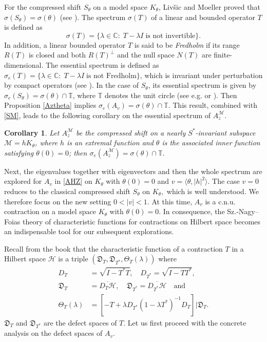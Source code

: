 \documentclass[12pt,reqno]{amsart}
\newtheorem{cor}[thm]{Corollary}
\theoremstyle{definition}
\theoremstyle{remark}
\numberwithin{equation}{section}
\newcommand{\la}{\langle}
\newcommand{\ra}{\rangle}
\newcommand{\ma}{\mathcal}
\begin{document}
For the compressed shift $S_\theta$ on a model space $K_\theta$, Liv\v{s}ic and Moeller  proved that $\sigma(S_\theta)=\sigma(\theta)$ (see \cite{Li,Mo}). The spectrum $\sigma(T)$ of a linear and bounded operator $T$ is defined as $$\sigma(T)=\{\lambda \in \mathbb{C}:\;T- \lambda I\;\mbox{is not invertible}\}.$$ In addition, a linear bounded operator $T$ is said to be \emph{Fredholm} if its range $R(T)$ is closed and both $R(T)^{\perp}$ and the null space $N(T)$ are finite-dimensional. The essential spectrum is defined as $\sigma_e(T)=\{\lambda\in \mathbb{C}:\; T-\lambda I\;\mbox{is not Fredholm}\}$, which is invariant under perturbation by compact operators (see \cite{SM}). In the case of  $S_\theta$, its essential spectrum is given by $\sigma_e(S_\theta)=\sigma(\theta)\cap \mathbb{T}$, where $\mathbb{T}$ denotes the unit circle (see e.g. \cite[Proposition 9.26]{GMR} or \cite[Lemma 2.5]{Sarason1}). Then Proposition \ref{Aztheta} implies $\sigma_e(A_v)=\sigma(\theta)\cap\mathbb{T}.$ This result, combined with  \eqref{SM}, leads to the following corollary on the essential spectrum of $A_z^\ma{M}$.

\begin{cor}\label{cor ess} Let $A_z^{\ma{M}}$ be the compressed shift on a nearly $S^*$-invariant subspace $\ma{M}=hK_\theta$, where $h$ is an extremal function and $\theta$ is the associated inner function satisfying $\theta(0)=0$;  then $\sigma_e(A_z^\ma{M})=\sigma(\theta)\cap\mathbb{T}.$\end{cor}


Next, the eigenvalues together with eigenvectors and then the whole spectrum are explored for $A_v$ in \eqref{AHZ}
on $K_\theta$ with $\theta(0)=0$ and $v=\la \theta, |h|^2\ra$. The case $v=0$ reduces to the classical compressed shift $S_\theta$ on $K_\theta,$ which is  well understood. We therefore focus on the new setting  $0<|v|<1$. At this time, $A_v$ is a c.n.u. contraction on a model space $K_\theta$ with $\theta(0)=0.$ In consequence, the Sz.-Nagy--Foias theory of characteristic functions for contractions on Hilbert space  becomes an indispensable tool for our subsequent explorations.

Recall from the book \cite{NFBK} that the characteristic function of a contraction $T$ in a Hilbert space $\ma{H}$ is a triple $(\mathfrak{D}_T, \mathfrak{D}_{T^*}, \Theta_T(\lambda))$ where
\begin{align*}
D_T &= \sqrt{I - T^* T}, \quad D_{T^*} = \sqrt{I - T T^*}, \\
\mathfrak{D}_T &= \overline{D_T \mathcal{H}}, \quad \mathfrak{D}_{T^*} = \overline{D_{T^*} \mathcal{H}}  \quad \text{and} \\
\Theta_T(\lambda) &= \left[ -T + \lambda D_{T^*} (1 - \lambda T^*)^{-1} D_T \right] \bigg| \mathfrak{D}_T.
\end{align*} $\mathfrak{D}_T$ and $\mathfrak{D}_{T^*}$ are the defect spaces of $T$.  Let us first proceed with the concrete analysis on the defect  spaces of $A_v$.
\end{document}
